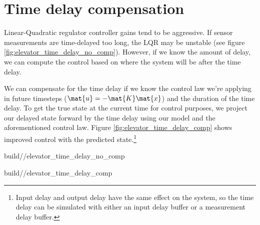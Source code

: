 \section{Time delay compensation}

Linear-Quadratic regulator controller gains tend to be aggressive. If sensor
measurements are time-delayed too long, the LQR may be unstable (see figure
\ref{fig:elevator_time_delay_no_comp}). However, if we know the amount of delay,
we can compute the control based on where the system will be after the time
delay.

We can compensate for the time delay if we know the control law we're applying
in future timesteps ($\mat{u} = -\mat{K}\mat{x}$) and the duration of the time
delay. To get the true state at the current time for control purposes, we
project our delayed state forward by the time delay using our model and the
aforementioned control law. Figure \ref{fig:elevator_time_delay_comp} shows
improved control with the predicted state.\footnote{Input delay and output delay
have the same effect on the system, so the time delay can be simulated with
either an input delay buffer or a measurement delay buffer.}
\begin{bookfigure}
  \begin{minisvg}{2}{build/\chapterpath/elevator_time_delay_no_comp}
    \caption{Elevator response at 5ms sample period with 50ms of output lag}
    \label{fig:elevator_time_delay_no_comp}
  \end{minisvg}
  \hfill
  \begin{minisvg}{2}{build/\chapterpath/elevator_time_delay_comp}
    \caption{Elevator response at 5ms sample period with 50ms of output lag
      (delay-compensated)}
    \label{fig:elevator_time_delay_comp}
  \end{minisvg}
\end{bookfigure}

